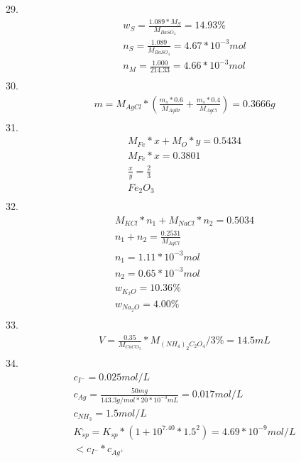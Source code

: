 \documentclass{article}
\begin{document}
29.\begin{equation}
    \begin{multlined}
        w_S = \frac{1.089*M_S}{M_{BaSO_4}} = 14.93\%\\
        n_S = \frac{1.089}{M_{BaSO_4}} = 4.67*10^{-3} mol\\
        n_M = \frac{1.000}{214.33} = 4.66*10^{-3} mol\\
    \end{multlined}
\end{equation}
30.\begin{equation}
    \begin{multlined}
        m = M_{AgCl}*(\frac{m_s*0.6}{M_{AgBr}}+\frac{m_s*0.4}{M_{AgCl}}) = 0.3666 g\\
    \end{multlined}
\end{equation}
31.\begin{equation}
    \begin{multlined}
        M_{Fe}*x+M_O*y = 0.5434\\
        M_{Fe}*x = 0.3801\\
        \frac{x}{y} = \frac{2}{3}\\
        Fe_2O_3\\
    \end{multlined}
\end{equation}
32.\begin{equation}
    \begin{multlined}
        M_{KCl}*n_1+M_{NaCl}*n_2 = 0.5034\\
        n_1 + n_2 = \frac{0.2531}{M_{AgCl}}\\
        n_1 = 1.11*10^{-3} mol\\
        n_2 = 0.65*10^{-3} mol\\
        w_{K_2O} = 10.36\%\\
        w_{Na_2O} = 4.00\%\\
    \end{multlined}
\end{equation}
33.\begin{equation}
    \begin{multlined}
        V = \frac{0.35}{M_{CaCO_3}}*M_{(NH_4)_2C_2O_4}/3\% = 14.5mL\\
    \end{multlined}
\end{equation}
34.\begin{equation}
    \begin{multlined}
    c_{I^-} = 0.025 mol/L\\
    c_{Ag} = \frac{50mg}{143.3 g/mol*20*10^{-3}mL} = 0.017 mol/L\\
    c_{NH_3} = 1.5 mol/L\\
    K^,_{sp} = K_{sp}*(1+10^{7.40}*1.5^2) = 4.69*10^{-9} mol/L \\
    < c_{I^-}*c_{Ag^+}\\
    \end{multlined}
\end{equation}
\end{document}
